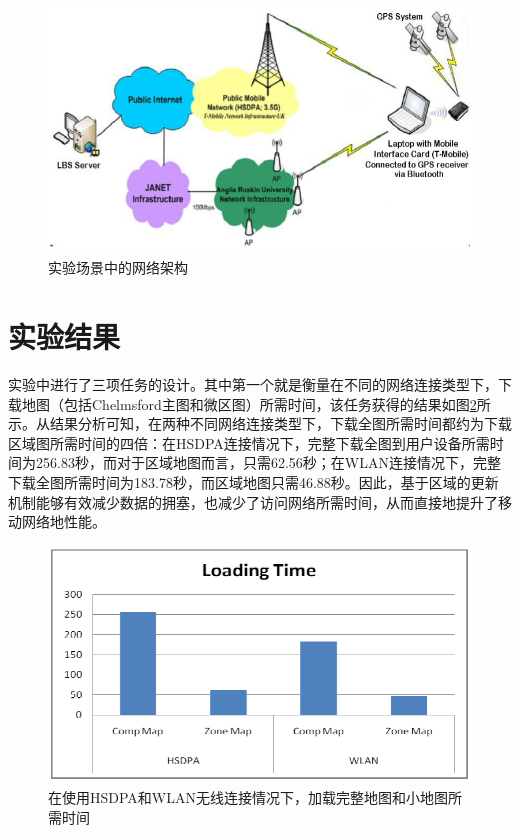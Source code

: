 \documentclass{article}
\begin{document}
\begin{CJK}{UTF8}{gbsn}
	\begin{figure}[htbp]
		\centering
		\includegraphics[bb=0 0 735 426, scale=0.45]{figure/fig06.png}
		\caption{实验场景中的网络架构}
		\label{fig:network-architected-for-experimental-scenarios}
	\end{figure}


	\section{实验结果}
	实验中进行了三项任务的设计。其中第一个就是衡量在不同的网络连接类型下，下载地图（包括Chelmsford主图和微区图）所需时间，该任务获得的结果如图\ref{fig:the-time-taken-to-load-maps}所示。从结果分析可知，在两种不同网络连接类型下，下载全图所需时间都约为下载区域图所需时间的四倍：在HSDPA连接情况下，完整下载全图到用户设备所需时间为256.83秒，而对于区域地图而言，只需62.56秒；在WLAN连接情况下，完整下载全图所需时间为183.78秒，而区域地图只需46.88秒。因此，基于区域的更新机制能够有效减少数据的拥塞，也减少了访问网络所需时间，从而直接地提升了移动网络地性能。

	\begin{figure}[htbp]
		\centering
		\includegraphics[bb=0 0 744 417, scale=0.45]{figure/fig07.png}
		\caption{在使用HSDPA和WLAN无线连接情况下，加载完整地图和小地图所需时间}
		\label{fig:the-time-taken-to-load-maps}
	\end{figure}


\end{CJK}
\end{document}
